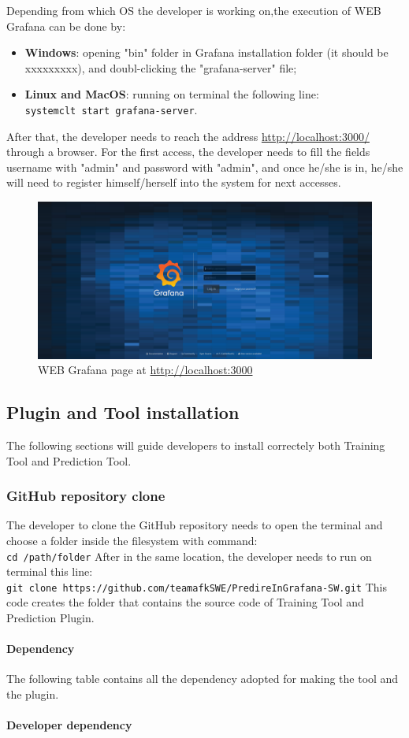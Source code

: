 Depending from which OS the developer is working on,the execution of WEB Grafana can be done by:
\begin{itemize}
\item \textbf{Windows}: opening "bin" folder in Grafana installation folder
(it should be xxxxxxxxx), and doubl-clicking the "grafana-server" file;
\item \textbf{Linux and MacOS}: running on terminal the following line:\\
\texttt{systemclt start grafana-server}.
\end{itemize} 
After that, the developer needs to reach the address \url{http://localhost:3000/} through a browser. For the first access, the developer needs to fill the fields username with "admin" and password with "admin", and once he/she is in, he/she will need to register himself/herself into the system for next accesses.

\begin{figure}[H]
\centering
\includegraphics[scale=0.25]{./img/web_grafana_login.png}
\caption{WEB Grafana page at \url{http://localhost:3000}}
\end{figure}
\subsection{Plugin and Tool installation}
The following sections will guide developers to install correctely both Training Tool and Prediction Tool.
\subsubsection{GitHub repository clone}
The developer to clone the GitHub repository needs to open the terminal and choose a folder inside the filesystem with command: \\
\texttt{cd /path/folder}
After in the same location, the developer needs to run on terminal this line:\\
\texttt{git clone https://github.com/teamafkSWE/PredireInGrafana-SW.git}
This code creates the folder that contains the source code of Training Tool and Prediction Plugin.
\paragraph*{Dependency}
The following table contains all the dependency adopted for making the tool and the plugin.

\paragraph*{Developer dependency}






